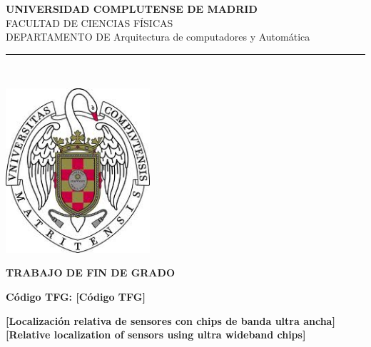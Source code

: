 \begin{center}

   \vspace{1cm}


   {\Large \textbf{UNIVERSIDAD COMPLUTENSE DE MADRID}}\\

   \vspace{0.3cm}
   {\Large FACULTAD DE CIENCIAS FÍSICAS}\\
   \vspace{0.3cm}
   {DEPARTAMENTO DE Arquitectura de computadores y Automática}\\

   

   \vspace{0.65cm}
   \rule{2in}{0.5pt}\\
   \vspace{0.85cm}

\vspace{0.5cm}

  \includegraphics[height=2.4in]{figures/escudo.jpg}

   \vspace{0.5cm}  
  {\large \textbf{TRABAJO DE FIN DE GRADO}}\\ 

  \vspace{0.3cm} 

  \textbf{Código TFG: [Código TFG]}\\
  
   \vspace{0.5cm}
     
  \textbf{[Localización relativa de sensores con chips de banda ultra ancha]}\\
  \vspace{0.3cm}  
  \textbf{[Relative localization of sensors using ultra wideband chips]}


\end{center}
